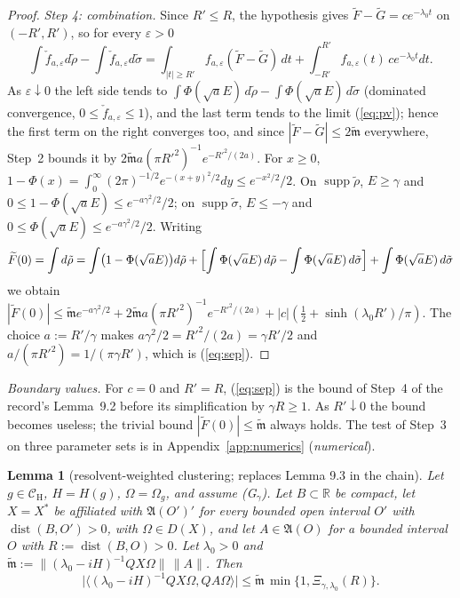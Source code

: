 \documentclass[11pt,a4paper]{article}
\newcommand{\R}{\mathbb{R}}
\newcommand{\A}{\mathfrak{A}}
\newcommand{\CH}{\mathcal{C}_{\mathrm H}}
\newcommand{\Om}{\Omega}
\newcommand{\ip}[2]{\langle #1,#2\rangle}
\DeclareMathOperator{\supp}{supp}
\DeclareMathOperator{\dist}{dist}
\newcommand{\Ft}{\widetilde F}
\newcommand{\Gt}{\widetilde G}
\newcommand{\mt}{\widetilde{\mathfrak m}}
\theoremstyle{plain}
\newtheorem{tlemma}{Lemma}
\theoremstyle{definition}
\begin{document}
\begin{proof}
\emph{Step 4: combination.}  Since $R'\le R$, the hypothesis gives
$\Ft-\Gt=ce^{-\lambda_0t}$ on $(-R',R')$, so for every $\varepsilon>0$
\[
 \int\check f_{a,\varepsilon}d\tilde\rho-\int\check f_{a,\varepsilon}d\tilde\sigma
 =\int_{|t|\ge R'}f_{a,\varepsilon}(\Ft-\Gt)\,dt+\int_{-R'}^{R'}f_{a,\varepsilon}(t)\,ce^{-\lambda_0t}dt .
\]
As $\varepsilon\downarrow0$ the left side tends to $\int\Phi(\sqrt aE)\,d\tilde\rho-\int\Phi(\sqrt
aE)\,d\tilde\sigma$ (dominated convergence, $0\le\check f_{a,\varepsilon}\le1$), and the last
term tends to the limit (\ref{eq:pv}); hence the first term on the right converges too, and
since $|\Ft-\Gt|\le2\mt$ everywhere, Step~2 bounds it by $2\mt a(\pi R'^2)^{-1}e^{-R'^2/(2a)}$.
For $x\ge0$, $1-\Phi(x)=\int_0^\infty(2\pi)^{-1/2}e^{-(x+y)^2/2}dy\le e^{-x^2/2}/2$.  On
$\supp\tilde\rho$, $E\ge\gamma$ and $0\le1-\Phi(\sqrt aE)\le e^{-a\gamma^2/2}/2$; on
$\supp\tilde\sigma$, $E\le-\gamma$ and $0\le\Phi(\sqrt aE)\le e^{-a\gamma^2/2}/2$.  Writing
\[
 \Ft(0)=\int d\tilde\rho=\int\bigl(1-\Phi(\sqrt aE)\bigr)d\tilde\rho
 +\Bigl[\int\Phi(\sqrt aE)\,d\tilde\rho-\int\Phi(\sqrt aE)\,d\tilde\sigma\Bigr]
 +\int\Phi(\sqrt aE)\,d\tilde\sigma
\]
we obtain $|\Ft(0)|\le\mt e^{-a\gamma^2/2}+2\mt a(\pi R'^2)^{-1}e^{-R'^2/(2a)}
+|c|(\frac12+\sinh(\lambda_0R')/\pi)$.  The choice $a:=R'/\gamma$ makes
$a\gamma^2/2=R'^2/(2a)=\gamma R'/2$ and $a/(\pi R'^2)=1/(\pi\gamma R')$, which is
(\ref{eq:sep}).
\end{proof}

\emph{Boundary values.}  For $c=0$ and $R'=R$, (\ref{eq:sep}) is the bound of Step~4 of the
record's Lemma~9.2 before its simplification by $\gamma R\ge1$.  As $R'\downarrow0$ the bound
becomes useless; the trivial bound $|\Ft(0)|\le\mt$ always holds.  The test of Step~3 on
three parameter sets is in Appendix~\ref{app:numerics} (\emph{numerical}).

\begin{tlemma}[resolvent-weighted clustering; replaces Lemma 9.3 in the chain]\label{lem:cluster}
Let $g\in\CH$, $H=H(g)$, $\Om=\Om_g$, and assume (G$_\gamma$).  Let $B\subset\R$ be compact, let
$X=X^*$ be affiliated with $\A(O')'$ for every bounded open interval $O'$ with $\dist(B,O')>0$,
with $\Om\in D(X)$, and let $A\in\A(O)$ for a bounded interval $O$ with $R:=\dist(B,O)>0$.
Let $\lambda_0>0$ and $\mt:=\|(\lambda_0-iH)^{-1}QX\Om\|\,\|A\|$.  Then
\[
 \bigl|\ip{(\lambda_0-iH)^{-1}QX\Om}{QA\Om}\bigr|\le\mt\,\min\{1,\Xi_{\gamma,\lambda_0}(R)\} .
\]
\end{tlemma}
\end{document}
